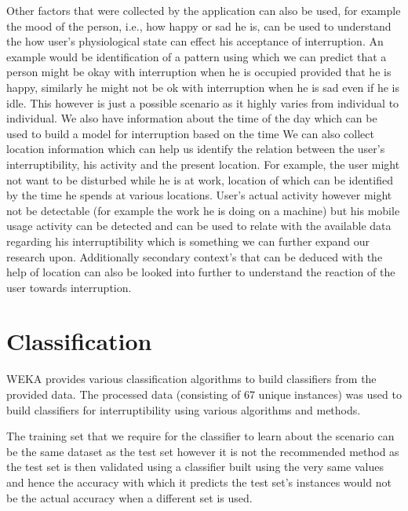\documentclass[10pt,a4paper]{article}
\begin{document}
Other factors that were collected by the application can also be used, for example the mood of the person, i.e., how happy or sad he is, can be used to understand the how user's physiological state can effect his acceptance of interruption. An example would be identification of a pattern using which we can predict that a person might be okay with interruption when he is occupied provided that he is happy, similarly he might not be ok with interruption when he is sad even if he is idle. This however is just a possible scenario as it highly varies from individual to individual. We also have information about the time of the day which can be used to build a model for interruption based on the time We can also collect location information which can help us identify the relation between the user's interruptibility, his activity and the present location. For example, the user might not want to be disturbed while he is at work, location of which can be identified by the time he spends at various locations. User's actual activity however might not be detectable (for example the work he is doing on a machine) but his mobile usage activity can be detected and can be used to relate with the available data regarding his interruptibility which is something we can further expand our research upon. Additionally secondary context's that can be deduced with the help of location can also be looked into further to understand the reaction of the user towards interruption.

\section{Classification}
\label{classification}  
WEKA provides various classification algorithms to build classifiers from the provided data. The processed data (consisting of 67 unique instances) was used to build classifiers for interruptibility using various algorithms and methods. 

The training set that we require for the classifier to learn about the scenario can be the same dataset as the test set however it is not the recommended method as the test set is then validated using a classifier built using the very same values and hence the accuracy with which it predicts the test set's instances would not be the actual accuracy when a different set is used.
\end{document}
